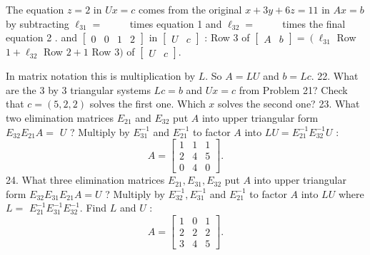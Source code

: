 The equation $z=2$ in $U x=c$ comes from the original $x+3 y+6 z=11$ in $A x=b$ by subtracting $\ell_{31}=$ $\qquad$ times equation 1 and $\ell_{32}=$ $\qquad$ times the final equation 2 . and $\left[\begin{array}{llll}0 & 0 & 1 & 2\end{array}\right]$ in $\left[\begin{array}{ll}U & c\end{array}\right]$ :
Row 3 of $\left[\begin{array}{ll}A & b\end{array}\right]=\left(\ell_{31}\right.$ Row $1+\ell_{32}$ Row $2+1$ Row 3$)$ of $\left[\begin{array}{ll}U & c\end{array}\right]$.

In matrix notation this is multiplication by $L$. So $A=L U$ and $b=L c$.
22. What are the 3 by 3 triangular systems $L c=b$ and $U x=c$ from Problem 21? Check that $c=(5,2,2)$ solves the first one. Which $x$ solves the second one?
23. What two elimination matrices $E_{21}$ and $E_{32}$ put $A$ into upper triangular form $E_{32} E_{21} A=$ $U$ ? Multiply by $E_{31}^{-1}$ and $E_{21}^{-1}$ to factor $A$ into $L U=E_{21}^{-1} E_{32}^{-1} U$ :
$$
A=\left[\begin{array}{lll}
1 & 1 & 1 \\
2 & 4 & 5 \\
0 & 4 & 0
\end{array}\right] .
$$
24. What three elimination matrices $E_{21}, E_{31}, E_{32}$ put $A$ into upper triangular form $E_{32} E_{31} E_{21} A=U$ ? Multiply by $E_{32}^{-1}, E_{31}^{-1}$ and $E_{21}^{-1}$ to factor $A$ into $L U$ where $L=$ $E_{21}^{-1} E_{31}^{-1} E_{32}^{-1}$. Find $L$ and $U$ :
$$
A=\left[\begin{array}{lll}
1 & 0 & 1 \\
2 & 2 & 2 \\
3 & 4 & 5
\end{array}\right] .
$$
